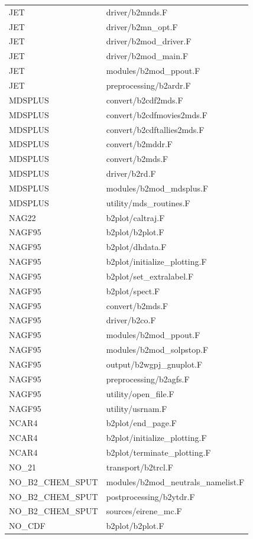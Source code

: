 \documentclass[a4paper,10pt]{report}
\begin{document}
\begin{center}
\begin{longtable}{|l|l|}
JET & driver/b2mnds.F \\
JET & driver/b2mn\_opt.F \\
JET & driver/b2mod\_driver.F \\
JET & driver/b2mod\_main.F \\
JET & modules/b2mod\_ppout.F \\
JET & preprocessing/b2ardr.F \\
MDSPLUS & convert/b2cdf2mds.F \\
MDSPLUS & convert/b2cdfmovies2mds.F \\
MDSPLUS & convert/b2cdftallies2mds.F \\
MDSPLUS & convert/b2mddr.F \\
MDSPLUS & convert/b2mds.F \\
MDSPLUS & driver/b2rd.F \\
MDSPLUS & modules/b2mod\_mdsplus.F \\
MDSPLUS & utility/mds\_routines.F \\
NAG22 & b2plot/caltraj.F \\
NAGF95 & b2plot/b2plot.F \\
NAGF95 & b2plot/dhdata.F \\
NAGF95 & b2plot/initialize\_plotting.F \\
NAGF95 & b2plot/set\_extralabel.F \\
NAGF95 & b2plot/spect.F \\
NAGF95 & convert/b2mds.F \\
NAGF95 & driver/b2co.F \\
NAGF95 & modules/b2mod\_ppout.F \\
NAGF95 & modules/b2mod\_solpstop.F \\
NAGF95 & output/b2wgpj\_gnuplot.F \\
NAGF95 & preprocessing/b2agfs.F \\
NAGF95 & utility/open\_file.F \\
NAGF95 & utility/usrnam.F \\
NCAR4 & b2plot/end\_page.F \\
NCAR4 & b2plot/initialize\_plotting.F \\
NCAR4 & b2plot/terminate\_plotting.F \\
NO\_21 & transport/b2trcl.F \\
NO\_B2\_CHEM\_SPUT & modules/b2mod\_neutrals\_namelist.F \\
NO\_B2\_CHEM\_SPUT & postprocessing/b2ytdr.F \\
NO\_B2\_CHEM\_SPUT & sources/eirene\_mc.F \\
NO\_CDF & b2plot/b2plot.F \\

\end{longtable}
\end{center}
\end{document}
